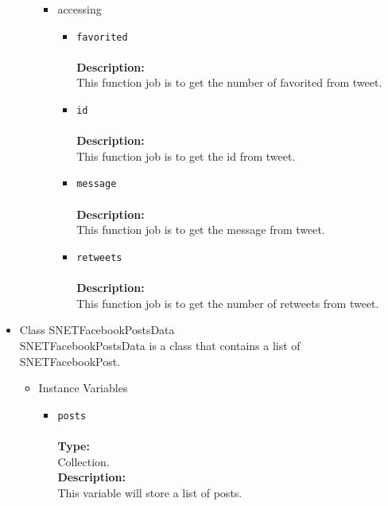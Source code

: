 \begin{itemize}
\begin{itemize}
\begin{itemize}
\item accessing
\label{sec-1-4-2-2-2-2}%
\begin{itemize}
\item \verb~favorited~\\\\
\textbf{Description:}\\
      This function job is to get the number of favorited from tweet.\\
\item \verb~id~\\\\
\textbf{Description:}\\
      This function job is to get the id from tweet.\\
\item \verb~message~\\\\
\textbf{Description:}\\
      This function job is to get the message from tweet.\\
\item \verb~retweets~\\\\
\textbf{Description:}\\
      This function job is to get the number of retweets from tweet.
\end{itemize}

\end{itemize} %
\end{itemize} %

\item Class SNETFacebookPostsData\\
\label{sec-1-4-2-3}%
SNETFacebookPostsData is a class that contains a list of SNETFacebookPost.

\begin{itemize}

\item Instance Variables
\label{sec-1-4-2-3-1}%
\begin{itemize}
\item \verb~posts~\\\\
\textbf{Type:}\\
     Collection.\\

     \textbf{Description:}\\
     This variable will store a list of posts.
\end{itemize}



\end{itemize}
\end{itemize}
